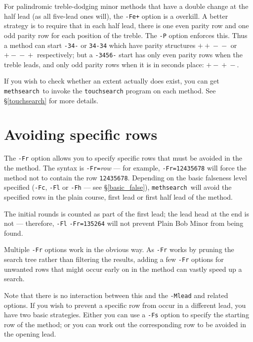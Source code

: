 \documentclass[a4paper,11pt,oneside]{book}
\makeatletter
\newcommand{\oidx}[2]{\index{#1@{\hspace*{-\optwidth}\texttt{-}#2}|ulink}}
\newcommand{\oi}[1]{\index{#1@{\hspace*{-\optwidth}\texttt{-}\texttt{#1}}}}
\def\methsearch{\texttt{meth\-search}}
\newcommand{\sref}[1]{\hyperref[#1]{\S\ref{#1}}}
\makeatother
\begin{document}
For palindromic treble-dodging minor methods that have a double change at 
the half lead (as all five-lead ones will), the \verb^-Fe+^ option is a
overkill.  A better strategy is to require that in each half lead, there 
is one even parity row and one odd parity row for each position
of the treble.  The \verb+-P+\oi{P} option enforces this.
Thus a method can start \verb+-34-+ or \verb+34-34+ which have 
parity structures $+{}+{}-{}-$ or $+{}-{}-{}+$ respectively; 
but a \verb+-3456-+ start has only even parity rows when the treble leads, 
and only odd parity rows when it is in seconds place: $+{}-{}+{}-$.

If you wish to check whether an extent actually does exist, you can 
get \methsearch\ to invoke the \texttt{touchsearch} program on each 
method.  See \sref{touchsearch} for more details.


\section{Avoiding specific rows}\label{avoidrow}

The \verb+-Fr+\oidx{Fr}{\texttt{Fr}} option allows you to specify
specific rows that must be avoided in the the method.%
The syntax is \verb+-Fr=+\textit{row} --- for example, \verb+-Fr=12435678+
will force the method not to contain the row \verb+12435678+.
Depending on the basic falseness level specified (\verb+-Fc+, \verb+-Fl+ 
or \verb+-Fh+\oi{Fc}\oi{Fl}\oi{Fh} --- see \sref{basic_false}), 
\methsearch\ will avoid the specified rows in the plain course, 
first lead or first half lead of the method.

The initial rounds is counted as part of the first lead;
the lead head at the end is not --- therefore, \verb+-Fl+ 
\verb+-Fr=135264+ will not prevent Plain Bob Minor from being found.

Multiple \verb+-Fr+ options work in the obvious way.  As \verb+-Fr+ works by 
pruning the search tree rather than filtering the results, adding a few 
\verb+-Fr+ options for unwanted rows that might occur early on in the 
method can vastly speed up a search.

Note that there is no interaction between this and the \verb+-Mlead+ and 
related options.  If you wish to prevent a specific row from occur in a 
different lead, you have two basic strategies.   Either you can use a 
\verb+-Fs+ option to specify the starting row of the method;
or you can work out the corresponding row to be avoided in the opening lead.  
\end{document}
